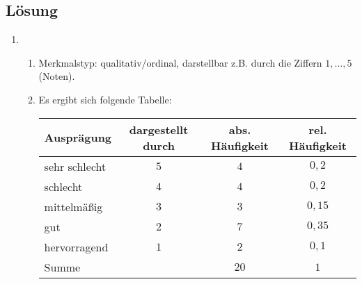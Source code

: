 \documentclass{exercise}
\begin{document}
    \subsection*{Lösung}
    \begin{enumerate}
        \item
        \begin{enumerate}
            \item Merkmalstyp: qualitativ/ordinal, darstellbar z.B. durch die Ziffern \(1, \ldots, 5\) (Noten).
            \item Es ergibt sich folgende Tabelle:
            \begin{center}
                \begin{tabular}{lccc}
                    \toprule
                    Ausprägung & dargestellt durch & abs. Häufigkeit & rel. Häufigkeit\\
                    \midrule
                    sehr schlecht & \(5\) & \(4\) & \(0,2\)\\
                    schlecht & \(4\) & \(4\) & \(0,2\)\\
                    mittelmäßig & \(3\) & \(3\) & \(0,15\)\\
                    gut & \(2\) & \(7\) & \(0,35\)\\
                    hervorragend & \(1\) & \(2\) & \(0,1\)\\
                    \midrule
                    Summe & & \(20\) & \(1\)\\
                    \bottomrule
                \end{tabular}
            \end{center}
            \begin{center}
\end{center}
\end{enumerate}
\end{enumerate}
\end{document}
